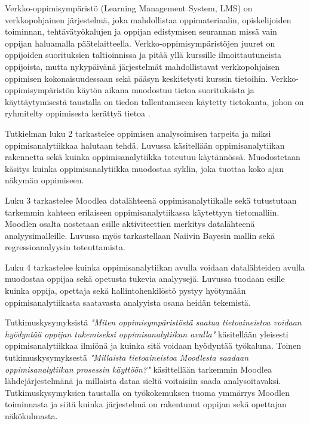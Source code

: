 Verkko-oppimisympäristö (Learning Management System, LMS) on verkkopohjainen järjestelmä, joka mahdollistaa oppimateriaalin, opiskelijoiden toiminnan, tehtävätyökalujen ja oppijan edistymisen seurannan \citep{mohdChoosingRightLearning2016} missä vain oppijan haluamalla päätelaitteella. Verkko-oppimisympäristöjen juuret on oppijoiden suorituksien taltioinnissa ja pitää yllä kurssille ilmoittautuneista oppijoista, mutta nykypäivänä järjestelmät mahdollistavat verkkopohjaisen oppimisen kokonaisuudessaan sekä pääsyn keskitetysti kurssin tietoihin. Verkko-oppimisympäristön käytön aikana muodostuu tietoa suorituksista ja käyttäytymisestä taustalla on tiedon tallentamiseen käytetty tietokanta, johon on ryhmitelty oppimisesta kerättyä tietoa \citep{romeroSurveyPreProcessingEducational2014}.

Tutkielman luku 2 tarkastelee oppimisen analysoimisen tarpeita ja miksi oppimisanalytiikkaa halutaan tehdä. Luvussa käsitellään oppimisanalytiikan rakennetta sekä kuinka oppimisanalytiikka toteutuu käytännössä. Muodostetaan käsitys kuinka oppimisanalytiikka muodostaa syklin, joka tuottaa koko ajan näkymän oppimiseen.

Luku 3 tarkastelee Moodlea datalähteenä oppimisanalytiikalle sekä tutustutaan tarkemmin kahteen erilaiseen oppimisanalytiikassa käytettyyn tietomalliin. Moodlen osalta nostetaan esille aktiviteettien merkitys datalähteenä analyysimalleille. Luvussa myös tarkastellaan Naiivin Bayesin mallin sekä regressioanalyysin toteuttamista.

Luku 4 tarkastelee kuinka oppimisanalytiikan avulla voidaan datalähteiden avulla muodostaa oppijaa sekä opetusta tukevia analyysejä. Luvussa tuodaan esille kuinka oppija, opettaja sekä hallintohenkilöstö pystyy hyötymään oppimisanalytiikasta saatavasta analyyista osana heidän tekemistä.

Tutkimuskysymyksistä \emph{"Miten oppimisympäristöstä saatua tietoaineistoa voidaan hyödyntää oppijan tukemiseksi oppimisanalytiikan avulla"} käsitellään yleisesti oppimisanalytiikkaa ilmiönä ja kuinka sitä voidaan hyödyntää työkaluna. Toinen tutkimuskysymyksestä \emph{"Millaista tietoaineistoa Moodlesta saadaan oppimisanalytiikan prosessin käyttöön?"} käsittellään tarkemmin Moodlea lähdejärjestelmänä ja millaista dataa sieltä voitaisiin saada analysoitavaksi. Tutkimuskysymyksien taustalla on työkokemuksen tuoma ymmärrys Moodlen toiminnasta ja siitä kuinka järjestelmä on rakentunut oppijan sekä opettajan näkökulmasta.
